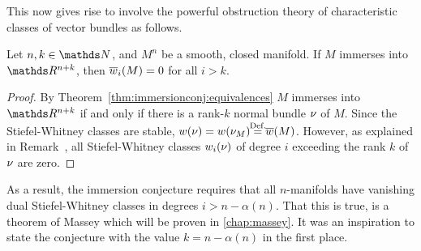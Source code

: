 This now gives rise to involve the powerful obstruction theory of
characteristic classes of vector bundles as follows.
\begin{Cor}\label{cor:obstruction}
  Let $n,k\in\Nat$, and $M^n$ be a smooth, closed manifold.
  If $M$ immerses into $\R^{n+k}$, then ${\overline{w}_{i}}(M)=0$ for all
  $i>k$.
  \begin{proof}
    By Theorem~\ref{thm:immersionconj:equivalences} $M$ immerses
    into $\R^{n+k}$ if and only if there is a rank-$k$
    normal bundle $\nu_{}$ of $M$.
    Since the Stiefel-Whitney classes are stable,
    $\W{\N{}}=\W{\N M}\cequalsby{Def.}\dualW{M}$.
    However, as explained in
    Remark~,
    all Stiefel-Whitney classes ${w_{i}}(\nu_{})$ of degree $i$ exceeding
    the rank $k$ of $\nu_{}$ are zero.
  \end{proof}
\end{Cor}
As a result, the immersion conjecture requires that all $n$-manifolds
have vanishing dual Stiefel-Whitney classes in degrees $i>n-\alpha(n)$.
That this is true, is a theorem of Massey which will be proven in
\autoref{chap:massey}. It was an inspiration to state the conjecture
with the value $k=n-\alpha(n)$ in the first place.


